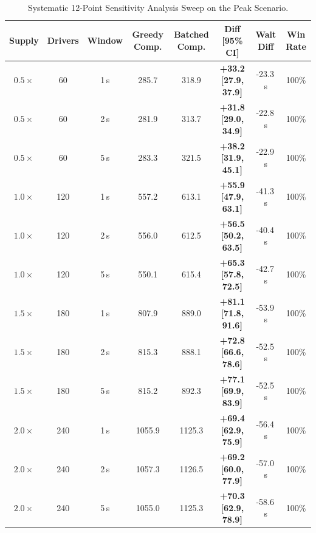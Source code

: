 \documentclass[11pt,a4paper]{article}
\begin{document}
\begin{table}[htbp]
\centering
\small
\begin{tabular}{c c c c c c c c}
\toprule
\textbf{Supply} & \textbf{Drivers} & \textbf{Window} & \textbf{Greedy Comp.} & \textbf{Batched Comp.} & \textbf{Diff [95\% CI]} & \textbf{Wait Diff} & \textbf{Win Rate} \\
\midrule
$0.5\times$ & 60 & 1\,s & 285.7 & 318.9 & \textbf{+33.2 [27.9, 37.9]} & -23.3\,s & 100\% \\
$0.5\times$ & 60 & 2\,s & 281.9 & 313.7 & \textbf{+31.8 [29.0, 34.9]} & -22.8\,s & 100\% \\
$0.5\times$ & 60 & 5\,s & 283.3 & 321.5 & \textbf{+38.2 [31.9, 45.1]} & -22.9\,s & 100\% \\
\midrule
$1.0\times$ & 120 & 1\,s & 557.2 & 613.1 & \textbf{+55.9 [47.9, 63.1]} & -41.3\,s & 100\% \\
$1.0\times$ & 120 & 2\,s & 556.0 & 612.5 & \textbf{+56.5 [50.2, 63.5]} & -40.4\,s & 100\% \\
$1.0\times$ & 120 & 5\,s & 550.1 & 615.4 & \textbf{+65.3 [57.8, 72.5]} & -42.7\,s & 100\% \\
\midrule
$1.5\times$ & 180 & 1\,s & 807.9 & 889.0 & \textbf{+81.1 [71.8, 91.6]} & -53.9\,s & 100\% \\
$1.5\times$ & 180 & 2\,s & 815.3 & 888.1 & \textbf{+72.8 [66.6, 78.6]} & -52.5\,s & 100\% \\
$1.5\times$ & 180 & 5\,s & 815.2 & 892.3 & \textbf{+77.1 [69.9, 83.9]} & -52.5\,s & 100\% \\
\midrule
$2.0\times$ & 240 & 1\,s & 1055.9 & 1125.3 & \textbf{+69.4 [62.9, 75.9]} & -56.4\,s & 100\% \\
$2.0\times$ & 240 & 2\,s & 1057.3 & 1126.5 & \textbf{+69.2 [60.0, 77.9]} & -57.0\,s & 100\% \\
$2.0\times$ & 240 & 5\,s & 1055.0 & 1125.3 & \textbf{+70.3 [62.9, 78.9]} & -58.6\,s & 100\% \\
\bottomrule
\end{tabular}
\caption{Systematic 12-Point Sensitivity Analysis Sweep on the Peak Scenario.}
\label{tab:sensitivity_sweep}
\end{table}
\end{document}
